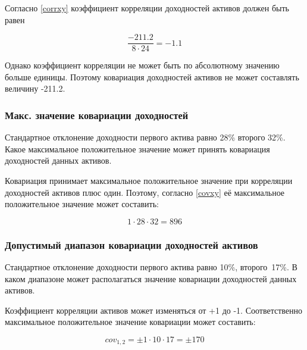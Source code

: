 \documentclass[12pt, table, a4paper,twoside]{exam}
\begin{document}
\begin{questions}
\begin{solution}[12em]

Согласно \eqref{corrxy} коэффициент корреляции доходностей активов должен быть равен

$$\frac{-211.2}{8\cdot24}=-1.1$$

Однако коэффициент корреляции не может быть по абсолютному значению больше единицы. Поэтому ковариация доходностей активов не может составлять величину -211.2.\newline

\end{solution}


\subsubsection{Макс. значение ковариации доходностей}
\question[10] Стандартное отклонение доходности первого актива равно 28\% второго 32\%. Какое максимальное положительное значение может принять ковариация доходностей данных активов.

\begin{solution}[12em]

\raggedright
Ковариация принимает максимальное положительное значение при корреляции доходностей активов плюс один. Поэтому, согласно \eqref{covxy} её максимальное положительное значение может составить:

$$1\cdot 28 \cdot 32=896$$
\end{solution}

\subsubsection{Допустимый диапазон ковариации доходностей активов}
\question[10] Стандартное отклонение доходности первого актива равно 10\%, второго~17\%. В каком диапазоне может располагаться значение ковариации доходностей данных активов.

\begin{solution}[12em]

\raggedright
Коэффициент корреляции активов может изменяться от +1 до -1. Соответственно максимальное положительное значение ковариации может составить:

$$cov_{1,2}=\pm 1 \cdot 10 \cdot 17=\pm 170$$

\end{solution}


\end{questions}
\end{document}
